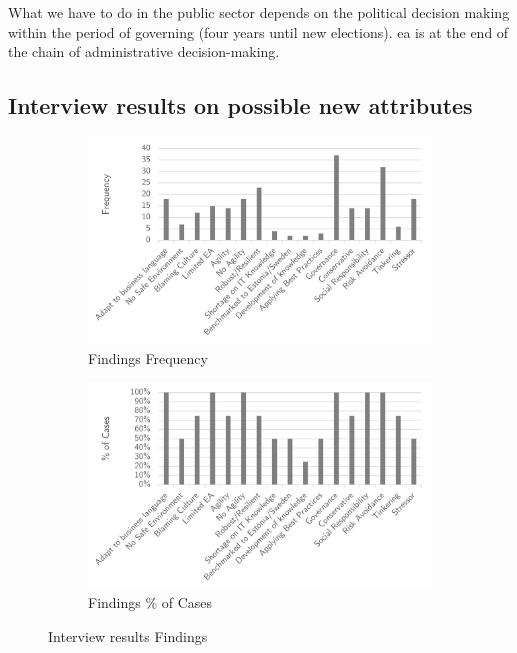 What we have to do in the public sector depends on the political decision making within the period of governing (four years until new elections). \acrshort{ea} is at the end of the chain of administrative decision-making.

\subsection{Interview results on possible new attributes}
\begin{figure}[H]
	\centering
	\begin{subfigure}[H]{0.5\textwidth}
		\centering
		\includegraphics[width=0.95\linewidth]{images/findings_frequency}
		\caption{Findings Frequency}
		\label{fig:findingsfrequency}
	\end{subfigure}%
	\begin{subfigure}[H]{0.5\textwidth}
		\centering
		\includegraphics[width=0.95\linewidth]{images/findings_cases}
		\caption{Findings \% of Cases}
		\label{fig:findingscases}
	\end{subfigure}
	\caption{Interview results Findings}
	\label{fig:interviewresultsfindings}
\end{figure}

